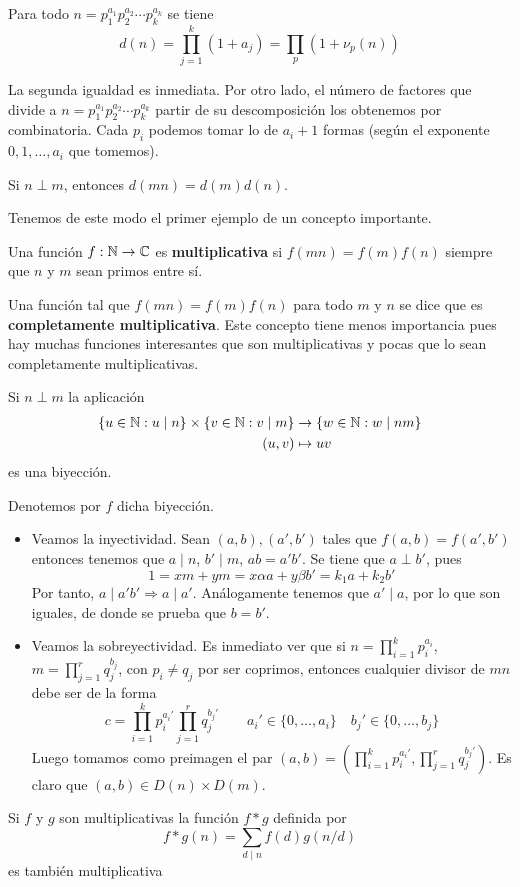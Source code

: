 \documentclass[TAN.tex]{subfiles}
\begin{document}
\begin{prop}
Para todo $n = p_1^{a_1}p_2^{a_2}\cdots p_k^{a_k}$ se tiene
\[ d(n) = \prod_{j=1}^k (1+a_j) = \prod_p (1+ν_p(n)) \]
\end{prop}
\begin{dem}
La segunda igualdad es inmediata. Por otro lado, el número de factores que divide a $n = p_1^{a_1}p_2^{a_2}\cdots p_k^{a_k}$  partir de su descomposición los obtenemos por combinatoria. Cada $p_i$ podemos tomar lo de $a_i+1$ formas (según el exponente $0,1,\dotsc,a_i$ que tomemos).
\end{dem}
\begin{coro}
Si $n \perp m$, entonces $d(mn) = d(m)d(n)$.
\end{coro}

Tenemos de este modo el primer ejemplo de un concepto importante.

\begin{defi}
Una función $f : \mathbb{N} \to \mathbb{C}$ es \textbf{multiplicativa} si $f(mn) = f(m)f(n)$ siempre que $n$ y $m$ sean primos entre sí.

Una función tal que $f(mn)=f(m)f(n)$ para todo $m$ y $n$ se dice que es \textbf{completamente multiplicativa}.
Este concepto tiene menos importancia pues hay muchas funciones interesantes que son multiplicativas y pocas que lo sean completamente multiplicativas.
\end{defi}

\begin{prop}
Si $n \perp m$ la aplicación
\begin{align*}
	\{ u \in \mathbb{N} : u \mid n\} \times \{v \in \mathbb{N} : v \mid m\} & \rightarrow \{ w \in \mathbb{N} : w \mid nm \}\\
	(u,v) & \mapsto uv
\end{align*}
es una biyección.
\end{prop}
\begin{dem}
Denotemos por $f$ dicha biyección. 
\begin{itemize} 
\item Veamos la inyectividad. Sean $(a,b),(a',b')$ tales que $f(a,b)=f(a',b')$ entonces tenemos que $a\mid n$, $b'\mid m$, $ab=a'b'$. Se tiene que $a\perp b'$, pues
$$
1=xm+ym = x\alpha a + y\beta b' = k_1 a + k_2 b'
$$
Por tanto, $a\mid a'b' \Rightarrow a\mid a'$. Análogamente tenemos que $a'\mid a$, por lo que son iguales, de donde se prueba que $b=b'$. 
\item Veamos la sobreyectividad. Es inmediato ver que si $n=\prod_{i=1}^k p_i ^{a_i}$, $m=\prod_{j=1}^r q_j^{b_j}$, con $p_i \neq q_j$ por ser coprimos, entonces cualquier divisor de $mn$ debe ser de la forma
$$
c = \prod_{i=1}^k p_i ^{a_i'}\prod_{j=1}^r q_j^{b_j'} \qquad a_i' \in \{0,\dotsc,a_i\} \quad b_j' \in \{0,\dotsc,b_j\}
$$
Luego tomamos como preimagen el par $(a,b) = (\prod_{i=1}^k p_i ^{a_i'},\prod_{j=1}^r q_j^{b_j'})$. Es claro que $(a,b) \in D(n)\times D(m)$.
\end{itemize}
\end{dem}
\begin{prop} Si $f$ y $g$ son multiplicativas la función $f * g$ definida por
\[ f * g (n) = \sum_{d\mid n} f(d)g(n/d) \]
es también multiplicativa
\end{prop}
\end{document}
